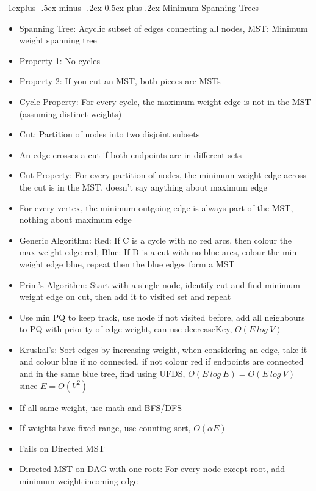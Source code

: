 \documentclass[10pt, landscape]{article}
\makeatletter
\renewcommand{\section}{\@startsection{section}{1}{0mm}%
                                {-1ex plus -.5ex minus -.2ex}%
                                {0.5ex plus .2ex}%
                                {\normalfont\large\bfseries}}
\renewcommand{\section}{\@startsection{section}{2}{0mm}%
                                {-1explus -.5ex minus -.2ex}%
                                {0.5ex plus .2ex}%
                                {\normalfont\normalsize\bfseries}}
\makeatother
\begin{document}
\begin{multicols*}{4}
\section{Minimum Spanning Trees}
\begin{itemize}
    \item Spanning Tree: Acyclic subset of edges connecting all nodes, MST: Minimum weight spanning tree
    \item Property 1: No cycles
    \item Property 2: If you cut an MST, both pieces are MSTs
    \item Cycle Property: For every cycle, the maximum weight edge is not in the MST (assuming distinct weights)
    \item Cut: Partition of nodes into two disjoint subsets
    \item An edge crosses a cut if both endpoints are in different sets
    \item Cut Property: For every partition of nodes, the minimum weight edge across the cut is in the MST, doesn't say anything about maximum edge
    \item For every vertex, the minimum outgoing edge is always part of the MST, nothing about maximum edge
    \item Generic Algorithm: Red: If C is a cycle with no red arcs, then colour the max-weight edge red, Blue: If D is a cut with no blue arcs, colour the min-weight edge blue, repeat then the blue edges form a MST
    \item Prim's Algorithm: Start with a single node, identify cut and find minimum weight edge on cut, then add it to visited set and repeat
    \item Use min PQ to keep track, use node if not visited before, add all neighbours to PQ with priority of edge weight, can use decreaseKey, $O(E \ log \ V)$
    \item Kruskal's: Sort edges by increasing weight, when considering an edge, take it and colour blue if no connected, if not colour red if endpoints are connected and in the same blue tree, find using UFDS, $O(E \ log \ E)=O(E\ log \ V)$ since $E=O(V^2)$
    \item If all same weight, use math and BFS/DFS
    \item If weights have fixed range, use counting sort, $O(\alpha E)$
    \item Fails on Directed MST
    \item Directed MST on DAG with one root: For every node except root, add minimum weight incoming edge
\end{itemize}


\end{multicols*}
\end{document}
